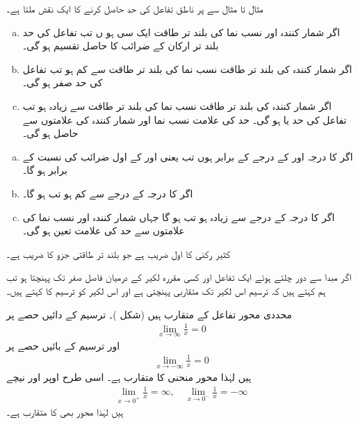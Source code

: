 مثال  تا مثال  سے  پر ناطق تفاعل کی حد حاصل کرنے کا ایک نقش ملتا ہے۔ 
\begin{enumerate}[a.]
\item
اگر شمار کنندہ اور نسب نما کی بلند تر طاقت ایک سی  ہو ں تب تفاعل کی حد بلند تر ارکان کے ضرائب  کا حاصل تقسیم ہو گی۔
\item
اگر شمار کنندہ کی بلند تر طاقت نسب نما کی بلند تر طاقت  سے کم ہو تب تفاعل کی حد صفر  ہو گی۔
\item
اگر شمار کنندہ کی بلند تر طاقت نسب نما کی بلند تر طاقت  سے زیادہ  ہو تب تفاعل کی حد  یا   ہو گی۔ حد کی علامت نسب نما اور شمار کنندہ کی علامتوں سے حاصل ہو گی۔ 
\end{enumerate}

\begin{enumerate}[a.]
\item 
اگر     کا درجہ اور     کے درجے کے برابر ہوں تب   یعنی     اور  کے اول ضرائب کی نسبت کے برابر ہو گا۔ 
\item 
اگر     کا درجہ    کے درجے سے کم ہو تب  ہو گا۔
 \item 
اگر     کا درجہ   کے درجے سے زیادہ ہو تب ہو گا جہاں شمار کنندہ اور نسب نما کی علامتوں سے  حد کی علامت تعین ہو گی۔
\end{enumerate}

کثیر رکنی  کا اول  ضریب   ہے جو بلند تر طاقتی جزو کا  ضریب  ہے۔

اگر مبدا سے دور چلتے ہوئے ایک تفاعل اور کسی مقررہ لکیر کے درمیان فاصل صفر تک پہنچتا ہو تب ہم کہتے ہیں کہ ترسیم  اس لکیر تک متقاربی پہنچتی ہے اور اس لکیر کو ترسیم کا  کہتے ہیں۔

محددی محور تفاعل  کے متقارب ہیں (شکل )۔ ترسیم کے دائیں حصے پر 
\begin{align*}
\lim_{x\to \infty}\frac{1}{x}=0
\end{align*}
اور ترسیم کے بائیں حصے پر
\begin{align*}
\lim_{x\to -\infty}\frac{1}{x}=0
\end{align*}
ہیں  لہٰذا محور    منحنی  کا متقارب ہے۔ اسی  طرح  اوپر اور نیچے
\begin{align*}
\lim_{x\to 0^+}\frac{1}{x}=\infty,\quad \lim_{x\to 0^-}\frac{1}{x}=-\infty
\end{align*}
ہیں لہٰذا محور  بھی  کا متقارب ہے۔

